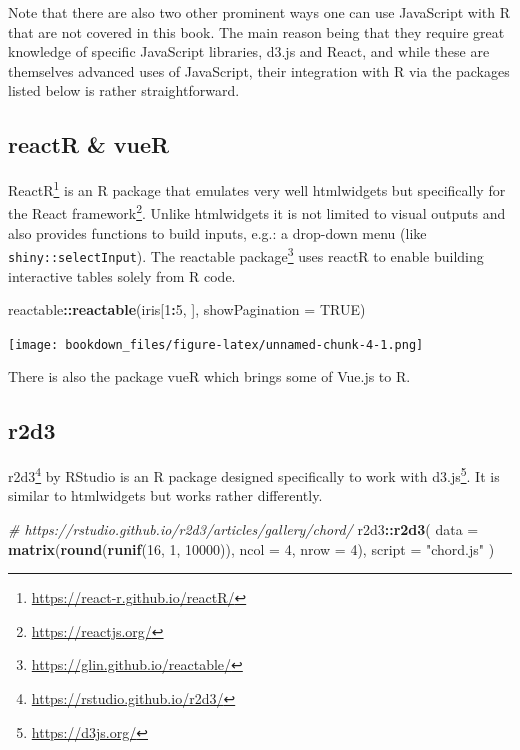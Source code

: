 \documentclass[
]{krantz}
\makeatletter
\newenvironment{Shaded}{\begin{snugshade}}{\end{snugshade}}
\newcommand{\CommentTok}[1]{\textcolor[rgb]{0.37,0.37,0.37}{\textit{#1}}}
\newcommand{\DataTypeTok}[1]{\textcolor[rgb]{0.27,0.27,0.27}{#1}}
\newcommand{\DecValTok}[1]{\textcolor[rgb]{0.06,0.06,0.06}{#1}}
\newcommand{\KeywordTok}[1]{\textcolor[rgb]{0.27,0.27,0.27}{\textbf{#1}}}
\newcommand{\NormalTok}[1]{#1}
\newcommand{\OperatorTok}[1]{\textcolor[rgb]{0.43,0.43,0.43}{\textbf{#1}}}
\newcommand{\OtherTok}[1]{\textcolor[rgb]{0.37,0.37,0.37}{#1}}
\newcommand{\StringTok}[1]{\textcolor[rgb]{0.5,0.5,0.5}{#1}}
\renewcommand{\href}[2]{#2\footnote{\url{#1}}}
\newenvironment{kframe}{%
\medskip{}
\setlength{\fboxsep}{.8em}
 \def\at@end@of@kframe{}%
 \ifinner\ifhmode%
  \def\at@end@of@kframe{\end{minipage}}%
  \begin{minipage}{\columnwidth}%
 \fi\fi%
 \def\FrameCommand##1{\hskip\@totalleftmargin \hskip-\fboxsep
 \colorbox{shadecolor}{##1}\hskip-\fboxsep
     \hskip-\linewidth \hskip-\@totalleftmargin \hskip\columnwidth}%
 \MakeFramed {\advance\hsize-\width
   \@totalleftmargin\z@ \linewidth\hsize
   \@setminipage}}%
 {\par\unskip\endMakeFramed%
 \at@end@of@kframe}
\renewenvironment{Shaded}{\begin{kframe}}{\end{kframe}}
\makeatother
\begin{document}
Note that there are also two other prominent ways one can use JavaScript with R that are not covered in this book. The main reason being that they require great knowledge of specific JavaScript libraries, d3.js and React, and while these are themselves advanced uses of JavaScript, their integration with R via the packages listed below is rather straightforward.

\hypertarget{intro-reactr-vuer}{%
\subsection{reactR \& vueR}\label{intro-reactr-vuer}}

\href{https://react-r.github.io/reactR/}{ReactR} \citep{R-reactR} is an R package that emulates very well htmlwidgets but specifically for the \href{https://reactjs.org/}{React framework}. Unlike htmlwidgets it is not limited to visual outputs and also provides functions to build inputs, e.g.: a drop-down menu (like \texttt{shiny::selectInput}). The \href{https://glin.github.io/reactable/}{reactable package} \citep{R-reactable} uses reactR to enable building interactive tables solely from R code.

\begin{Shaded}
\begin{Highlighting}[]
\NormalTok{reactable}\OperatorTok{::}\KeywordTok{reactable}\NormalTok{(iris[}\DecValTok{1}\OperatorTok{:}\DecValTok{5}\NormalTok{, ], }\DataTypeTok{showPagination =} \OtherTok{TRUE}\NormalTok{)}
\end{Highlighting}
\end{Shaded}

\texttt{[image: bookdown\_files/figure-latex/unnamed-chunk-4-1.png]}

There is also the package vueR \citep{R-vueR} which brings some of Vue.js to R.

\hypertarget{intro-r2d3}{%
\subsection{r2d3}\label{intro-r2d3}}

\href{https://rstudio.github.io/r2d3/}{r2d3} \citep{R-r2d3} by RStudio is an R package designed specifically to work with \href{https://d3js.org/}{d3.js}. It is similar to htmlwidgets but works rather differently.

\begin{Shaded}
\begin{Highlighting}[]
\CommentTok{\# https://rstudio.github.io/r2d3/articles/gallery/chord/}
\NormalTok{r2d3}\OperatorTok{::}\KeywordTok{r2d3}\NormalTok{(}
  \DataTypeTok{data =} \KeywordTok{matrix}\NormalTok{(}\KeywordTok{round}\NormalTok{(}\KeywordTok{runif}\NormalTok{(}\DecValTok{16}\NormalTok{, }\DecValTok{1}\NormalTok{, }\DecValTok{10000}\NormalTok{)), }\DataTypeTok{ncol =} \DecValTok{4}\NormalTok{, }\DataTypeTok{nrow =} \DecValTok{4}\NormalTok{), }
  \DataTypeTok{script =} \StringTok{"chord.js"}
\NormalTok{)}
\end{Highlighting}
\end{Shaded}
\end{document}
